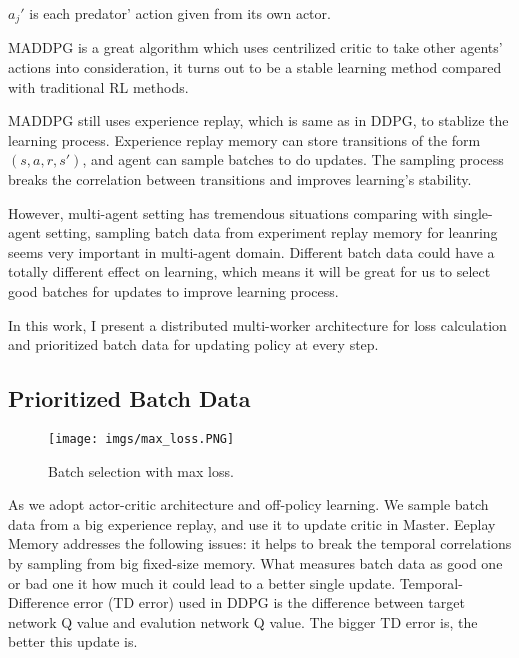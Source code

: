 \documentclass[11pt,twocolumn]{jarticle} %
\begin{document}
$a_j'$ is each predator' action given from its own actor. \par
MADDPG is a great algorithm which uses centrilized critic to take other agents' actions into consideration, it turns out to be a stable learning method compared with traditional RL methods. \par

MADDPG still uses experience replay, which is same as in DDPG, to stablize the learning process. Experience replay \cite{replay} memory can store transitions of the form $(s,a,r,s')$, and agent can sample batches to do updates. The sampling process breaks the correlation between transitions and improves learning's stability. \par

However, multi-agent setting has tremendous situations comparing with single-agent setting, sampling batch data from experiment replay memory for leanring seems very important in multi-agent domain. Different batch data could have a totally different effect on learning, which means it will be great for us to select good batches for updates to improve learning process. \par

In this work, I present a distributed multi-worker architecture for loss calculation and prioritized batch data for updating policy at every step.

\subsection{Prioritized Batch Data}
\begin{figure}[h]
 \begin{center}
  \texttt{[image: imgs/max\_loss.PNG]}
  \caption{
  Batch selection with max loss.
  }
  \label{fig:max_loss}
 \end{center}
\end{figure}
As we adopt actor-critic architecture and off-policy learning. We sample batch data from a big experience replay, and use it to update critic in Master. 
Eeplay Memory addresses the following issues: it helps to break the temporal correlations by sampling from big fixed-size memory. What measures batch data as good one or bad one it how much it could lead to a better single update. Temporal-Difference error (TD error) used in DDPG is the difference between target network Q value and evalution network Q value. The bigger TD error is, the better this update is. \par
\end{document}
